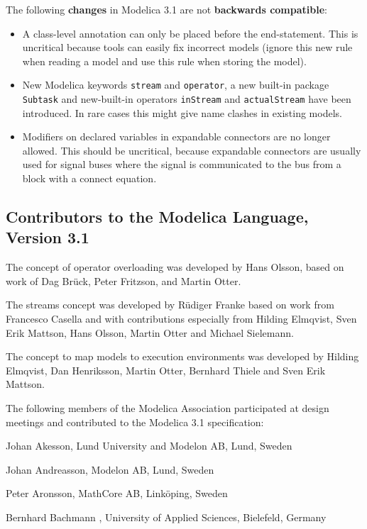 The following \textbf{changes} in Modelica 3.1 are not \textbf{backwards
compatible}:

\begin{itemize}
\item
  A class-level annotation can only be placed before the end-statement.
  This is uncritical because tools can easily fix incorrect models
  (ignore this new rule when reading a model and use this rule when
  storing the model).
\item
  New Modelica keywords \lstinline!stream! and \lstinline!operator!, a new built-in
  package \lstinline!Subtask! and new-built-in operators \lstinline!inStream! and
  \lstinline!actualStream! have been introduced. In rare cases this might give
  name clashes in existing models.
\item
  Modifiers on declared variables in expandable connectors are no longer
  allowed. This should be uncritical, because expandable connectors are
  usually used for signal buses where the signal is communicated to the
  bus from a block with a connect equation.
\end{itemize}

\subsection{Contributors to the Modelica Language, Version 3.1}

The concept of operator overloading was developed by Hans Olsson, based
on work of Dag Brück, Peter Fritzson, and Martin Otter.

The streams concept was developed by Rüdiger Franke based on work from
Francesco Casella and with contributions especially from Hilding
Elmqvist, Sven Erik Mattson, Hans Olsson, Martin Otter and Michael
Sielemann.

The concept to map models to execution environments was developed by
Hilding Elmqvist, Dan Henriksson, Martin Otter, Bernhard Thiele and Sven
Erik Mattson.

The following members of the Modelica Association participated at design
meetings and contributed to the Modelica 3.1 specification:

Johan Akesson, Lund University and Modelon AB, Lund, Sweden

Johan Andreasson, Modelon AB, Lund, Sweden

Peter Aronsson, MathCore AB, Linköping, Sweden

Bernhard Bachmann , University of Applied Sciences, Bielefeld, Germany

